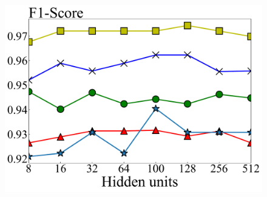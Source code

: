 \documentclass[review]{elsarticle}
\begin{document}
\begin{figure}[tbp]
{\begin{minipage}[b]{0.35\linewidth}
			\includegraphics[width=1\linewidth]{hidden_units_events}
		\end{minipage}
	}
	

\end{figure}
\end{document}
